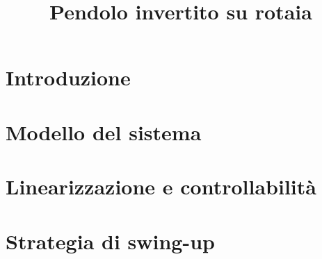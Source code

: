 \title{Pendolo invertito su rotaia}
\maketitle
\label{sec:dpic}



\section{Introduzione}



\section{Modello del sistema}

\section{Linearizzazione e controllabilità}

\section{Strategia di swing-up}